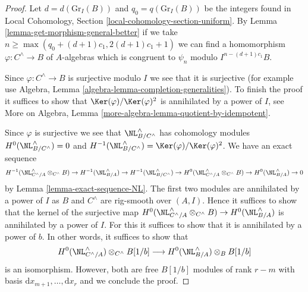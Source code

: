 \begin{proof}
\medskip\noindent
Let $d = d(\text{Gr}_I(B))$ and $q_0 = q(\text{Gr}_I(B))$ be the integers
found in 
Local Cohomology, Section \ref{local-cohomology-section-uniform}.
By Lemma \ref{lemma-get-morphism-general-better} if we take
$n \geq \max(q_0 + (d + 1)c_1, 2(d + 1)c_1 + 1)$ we can find a homomorphism
$\varphi : C^\wedge \to B$ of $A$-algebras which is congruent to
$\psi_n$ modulo $I^{n - (d + 1)c_1}B$.

\medskip\noindent
Since $\varphi : C^\wedge \to B$ is surjective modulo $I$
we see that it is surjective (for example use
Algebra, Lemma \ref{algebra-lemma-completion-generalities}).
To finish the proof it suffices to show that
$\Ker(\varphi)/\Ker(\varphi)^2$ is annihilated by a power of $I$, see
More on Algebra, Lemma \ref{more-algebra-lemma-quotient-by-idempotent}.

\medskip\noindent
Since $\varphi$ is surjective we see that
$\NL_{B/C^{\wedge}}^\wedge$ has cohomology modules
$H^0(\NL_{B/C^{\wedge}}^\wedge) = 0$ and
$H^{-1}(\NL_{B/C^{\wedge}}^\wedge) = \Ker(\varphi)/\Ker(\varphi)^2$.
We have an exact sequence
$$
H^{-1}(\NL_{C^\wedge/A}^\wedge \otimes_{C^\wedge} B) \to
H^{-1}(\NL_{B/A}^\wedge) \to
H^{-1}(\NL_{B/C^{\wedge}}^\wedge) \to
H^0(\NL_{C^\wedge/A}^\wedge \otimes_{C^\wedge} B) \to
H^0(\NL_{B/A}^\wedge) \to 0
$$
by Lemma \ref{lemma-exact-sequence-NL}. The first two modules are
annihilated by a power of $I$ as $B$ and $C^\wedge$ are rig-smooth over
$(A, I)$. Hence it suffices
to show that the kernel of the surjective map
$H^0(\NL_{C^\wedge/A}^\wedge \otimes_{C^\wedge} B) \to
H^0(\NL_{B/A}^\wedge)$ is annihilated by a power of $I$.
For this it suffices to show that it is annihilated by
a power of $b$. In other words, it suffices to show that
$$
H^0(\NL_{C^\wedge/A}^\wedge) \otimes_{C^\wedge} B[1/b]
\longrightarrow
H^0(\NL_{B/A}^\wedge) \otimes_B B[1/b]
$$
is an isomorphism. However, both are free $B[1/b]$ modules
of rank $r - m$ with basis $\text{d}x_{m + 1}, \ldots, \text{d}x_r$
and we conclude the proof.
\end{proof}

